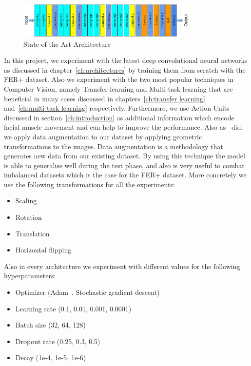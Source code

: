 \begin{figure}[H]
    \begin{center}
    \includegraphics[width=0.8\textwidth]{images/state_of_the_art.pdf}
    \end{center}
    \caption{State of the Art Architecture} \label{fig:state_of_the_art}
\end{figure}

In this project, we experiment with the latest deep convolutional neural networks as discussed in chapter~\ref{ch:architectures} by training them from scratch with the FER+ dataset. Also we experiment with the two most popular techniques in Computer Vision, namely Transfer learning and Multi-task learning that are beneficial in many cases discussed in chapters~\ref{ch:transfer learning} and~\ref{ch:multi-task learning} respectively. Furthermore, we use Action Units discussed in section~\ref{ch:introduction} as additional information which encode facial muscle movement and can help to improve the performance. Also as~\cite{barsoum2016training} did, we apply data augmentation to our dataset by applying geometric transformations to the images. Data augmentation is a methodology that generates new data from our existing dataset. By using this technique the model is able to generalise well during the test phase, and also is very useful to combat imbalanced datasets which is the case for the FER+ dataset. More concretely we use the following transformations for all the experiments:

\begin{itemize}
  \item Scaling
  \item Rotation
  \item Translation
  \item Horizontal flipping
\end{itemize}

Also in every architecture we experiment with different values for the following hyperparameters:

\begin{itemize}
  \item Optimizer (Adam~\cite{kingma2014adam}, Stochastic gradient descent)
  \item Learning rate (0.1, 0.01, 0.001, 0.0001)
  \item Batch size (32, 64, 128)
  \item Dropout rate (0.25, 0.3, 0.5)
  \item Decay (1e-4, 1e-5, 1e-6)
\end{itemize}

